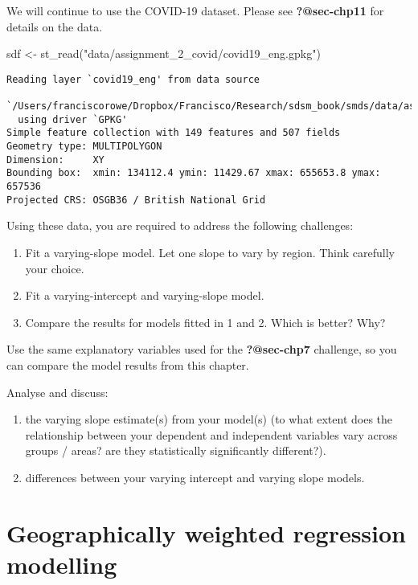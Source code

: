 \documentclass[
  letterpaper,
  krantz2]{style/krantz}
\newenvironment{Shaded}{\begin{snugshade}}{\end{snugshade}}
\newcommand{\FunctionTok}[1]{\textcolor[rgb]{0.28,0.35,0.67}{#1}}
\newcommand{\NormalTok}[1]{\textcolor[rgb]{0.00,0.23,0.31}{#1}}
\newcommand{\OtherTok}[1]{\textcolor[rgb]{0.00,0.23,0.31}{#1}}
\newcommand{\StringTok}[1]{\textcolor[rgb]{0.13,0.47,0.30}{#1}}
\providecommand{\tightlist}{%
  \setlength{\itemsep}{0pt}\setlength{\parskip}{0pt}}\usepackage{longtable,booktabs,array}
\begin{document}
We will continue to use the COVID-19 dataset. Please see
\textbf{?@sec-chp11} for details on the data.

\begin{Shaded}
\begin{Highlighting}[]
\NormalTok{sdf }\OtherTok{\textless{}{-}} \FunctionTok{st\_read}\NormalTok{(}\StringTok{"data/assignment\_2\_covid/covid19\_eng.gpkg"}\NormalTok{)}
\end{Highlighting}
\end{Shaded}

\begin{verbatim}
Reading layer `covid19_eng' from data source 
  `/Users/franciscorowe/Dropbox/Francisco/Research/sdsm_book/smds/data/assignment_2_covid/covid19_eng.gpkg' 
  using driver `GPKG'
Simple feature collection with 149 features and 507 fields
Geometry type: MULTIPOLYGON
Dimension:     XY
Bounding box:  xmin: 134112.4 ymin: 11429.67 xmax: 655653.8 ymax: 657536
Projected CRS: OSGB36 / British National Grid
\end{verbatim}

Using these data, you are required to address the following challenges:

\begin{enumerate}
\def\labelenumi{\arabic{enumi}.}
\item
  Fit a varying-slope model. Let one slope to vary by region. Think
  carefully your choice.
\item
  Fit a varying-intercept and varying-slope model.
\item
  Compare the results for models fitted in 1 and 2. Which is better?
  Why?
\end{enumerate}

Use the same explanatory variables used for the \textbf{?@sec-chp7}
challenge, so you can compare the model results from this chapter.

Analyse and discuss:

\begin{enumerate}
\def\labelenumi{\arabic{enumi}.}
\tightlist
\item
  the varying slope estimate(s) from your model(s) (to what extent does
  the relationship between your dependent and independent variables vary
  across groups / areas? are they statistically significantly
  different?).
\item
  differences between your varying intercept and varying slope models.
\end{enumerate}

\hypertarget{geographically-weighted-regression-modelling}{%
\chapter{Geographically weighted regression
modelling}\label{geographically-weighted-regression-modelling}}
\end{document}
